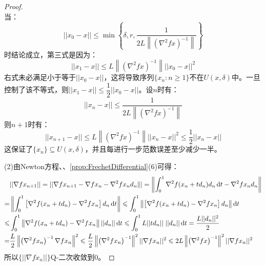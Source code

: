 \begin{proof}
\begin{equation*}
	\end{equation*}
	当：
	\begin{equation*}
		||x_0-x||\leqslant\min\left\{\delta,r,\frac{1}{2L\left\|\left(\nabla^2fx\right)^{-1}\right\|}\right\}
	\end{equation*}
	时结论成立，第三式是因为：
	\begin{equation*}
		||x_1-x||\leqslant L\left\|\left(\nabla^2fx\right)^{-1}\right\|||x_0-x||^2
	\end{equation*}
	右式未必满足小于等于$||x_0-x||$，这将导致序列$\{x_n:n\geqslant1\}$不在$U(x,\delta)$中。一旦控制了该不等式，则$||x_1-x||\leqslant\dfrac{1}{2}||x_0-x||$。设$n$时有：
	\begin{equation*}
		||x_n-x||\leqslant\frac{1}{2L\left\|\left(\nabla^2fx\right)^{-1}\right\|}
	\end{equation*}
	则$n+1$时有：
	\begin{equation*}
		||x_{n+1}-x||\leqslant L\left\|\left(\nabla^2fx\right)^{-1}\right\|||x_n-x||^2\leqslant\frac{1}{2}||x_n-x||
	\end{equation*}
	这保证了$\{x_n\}\subseteq U(x,\delta)$，并且每进行一步范数误差至少减少一半。\par
	(2)由Newton方程、、\cref{prop:FrechetDifferential}(6)可得：
	\begin{align*}
		&||\nabla fx_{n+1}||=||\nabla fx_{n+1}-\nabla fx_n-\nabla^2fx_nd_n\||=\left\|\int_{0}^{1}\nabla^2f(x_n+td_n)d_n\mathop{}\!\mathrm{d} t-\nabla^2fx_nd_n\right\| \\
		=&\left\|\int_{0}^{1}\left[\nabla^2f(x_n+td_n)-\nabla^2fx_n\right]d_n\mathop{}\!\mathrm{d} t\right\|\leqslant\int_{0}^{1}\left\|\left[\nabla^2f(x_n+td_n)-\nabla^2fx_n\right]d_n\right\|\mathop{}\!\mathrm{d} t \\
		\leqslant&\int_{0}^{1}\left\|\nabla^2f(x_n+td_n)-\nabla^2fx_n\right\|||d_n||\mathop{}\!\mathrm{d} t\leqslant\int_{0}^{1}L||td_n||\;||d_n||\mathop{}\!\mathrm{d} t=\frac{L||d_n||^2}{2} \\
		=&\frac{L}{2}\left\|\left(\nabla^2fx_n\right)^{-1}\nabla fx_n\right\|^2\leqslant\frac{L}{2}\left\|\left(\nabla^2fx_n\right)^{-1}\right\|^2||\nabla fx_n||^2\leqslant2L\left\|\left(\nabla^2fx\right)^{-1}\right\|^2||\nabla fx_n||^2
	\end{align*}
	所以$\{||\nabla fx_n||\}$Q-二次收敛到$0$。
\end{proof}

